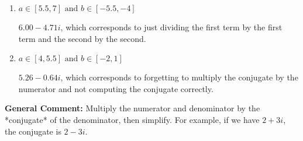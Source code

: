 \documentclass{extbook}[14pt]
\begin{document}
\begin{enumerate}
{\begin{enumerate}[label=\Alph*.]
 $-0.18  + 450.00 i$, which corresponds to forgetting to multiply the conjugate by the numerator.
\item \( a \in [5.5, 7] \text{ and } b \in [-5.5, -4] \)

 $6.00  - 4.71 i$, which corresponds to just dividing the first term by the first term and the second by the second.
\item \( a \in [4, 5.5] \text{ and } b \in [-2, 1] \)

 $5.26  - 0.64 i$, which corresponds to forgetting to multiply the conjugate by the numerator and not computing the conjugate correctly.
\end{enumerate}

\textbf{General Comment:} Multiply the numerator and denominator by the *conjugate* of the denominator, then simplify. For example, if we have $2+3i$, the conjugate is $2-3i$.
}
\end{enumerate}
\end{document}
